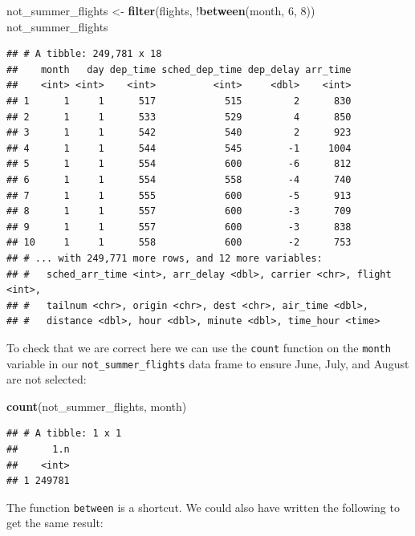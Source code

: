 \documentclass[]{tufte-book}
\newenvironment{Shaded}{\begin{snugshade}}{\end{snugshade}}
\newcommand{\KeywordTok}[1]{\textcolor[rgb]{0.13,0.29,0.53}{\textbf{{#1}}}}
\newcommand{\DecValTok}[1]{\textcolor[rgb]{0.00,0.00,0.81}{{#1}}}
\newcommand{\StringTok}[1]{\textcolor[rgb]{0.31,0.60,0.02}{{#1}}}
\newcommand{\NormalTok}[1]{{#1}}
\begin{document}
\begin{Shaded}
\begin{Highlighting}[]
\NormalTok{not_summer_flights <-}\StringTok{ }\KeywordTok{filter}\NormalTok{(flights,}
                             \NormalTok{!}\KeywordTok{between}\NormalTok{(month, }\DecValTok{6}\NormalTok{, }\DecValTok{8}\NormalTok{))}
\NormalTok{not_summer_flights}
\end{Highlighting}
\end{Shaded}

\begin{verbatim}
## # A tibble: 249,781 x 18
##    month   day dep_time sched_dep_time dep_delay arr_time
##    <int> <int>    <int>          <int>     <dbl>    <int>
## 1      1     1      517            515         2      830
## 2      1     1      533            529         4      850
## 3      1     1      542            540         2      923
## 4      1     1      544            545        -1     1004
## 5      1     1      554            600        -6      812
## 6      1     1      554            558        -4      740
## 7      1     1      555            600        -5      913
## 8      1     1      557            600        -3      709
## 9      1     1      557            600        -3      838
## 10     1     1      558            600        -2      753
## # ... with 249,771 more rows, and 12 more variables:
## #   sched_arr_time <int>, arr_delay <dbl>, carrier <chr>, flight <int>,
## #   tailnum <chr>, origin <chr>, dest <chr>, air_time <dbl>,
## #   distance <dbl>, hour <dbl>, minute <dbl>, time_hour <time>
\end{verbatim}

To check that we are correct here we can use the \texttt{count} function
on the \texttt{month} variable in our \texttt{not\_summer\_flights} data
frame to ensure June, July, and August are not selected:

\begin{Shaded}
\begin{Highlighting}[]
\KeywordTok{count}\NormalTok{(not_summer_flights, month)}
\end{Highlighting}
\end{Shaded}

\begin{verbatim}
## # A tibble: 1 x 1
##      1.n
##    <int>
## 1 249781
\end{verbatim}

The function \texttt{between} is a shortcut. We could also have written
the following to get the same result:
\end{document}
